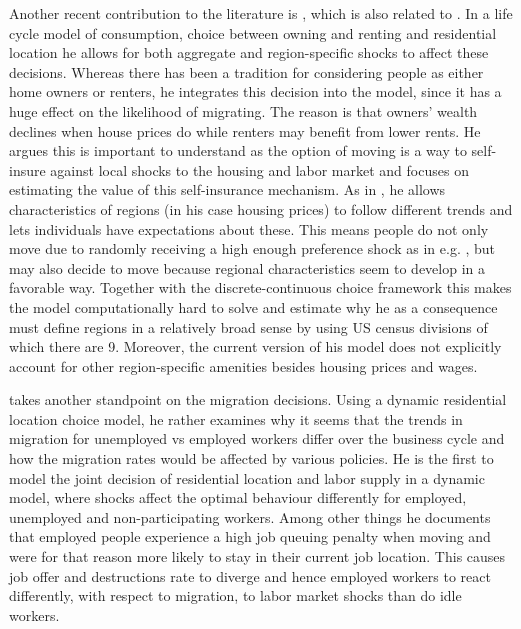 Another recent contribution to the literature is \citet{Oswald2015}, which is also related to \citet{Winkler2011}. In a life cycle model of consumption, choice between owning and renting and residential location he allows for both aggregate and region-specific shocks to affect these decisions. Whereas there has been a tradition for considering people as either home owners or renters, he integrates this decision into the model, since it has a huge effect on the likelihood of migrating. The reason is that owners' wealth declines when house prices do while renters may benefit from lower rents. He argues this is important to understand as the option of moving is a way to self-insure against local shocks to the housing and labor market and focuses on estimating the value of this self-insurance mechanism. As in \citet{Bayer2016}, he allows characteristics of regions (in his case housing prices) to follow different trends and lets individuals have expectations about these. This means people do not only move due to randomly receiving a high enough preference shock as in e.g. \citet{KennanWalker2011}, but may also decide to move because regional characteristics seem to develop in a favorable way. Together with the discrete-continuous choice framework this makes the model computationally hard to solve and estimate why he as a consequence must define regions in a relatively broad sense by using US census divisions of which there are 9. Moreover, the current version of his model does not explicitly account for other region-specific amenities besides housing prices and wages. 

\citet{Ransom2016} takes another standpoint on the migration decisions. Using a dynamic residential location choice model, he rather examines why it seems that the trends in migration for unemployed vs employed workers differ over the business cycle and how the migration rates would be affected by various policies. He is the first to model the joint decision of residential location and labor supply in a dynamic model, where shocks affect the optimal behaviour differently for employed, unemployed and non-participating workers. Among other things he documents that employed people experience a high job queuing penalty when moving and were for that reason more likely to stay in their current job location. This causes job offer and destructions rate to diverge and hence employed workers to react differently, with respect to migration, to labor market shocks than do idle workers. 

